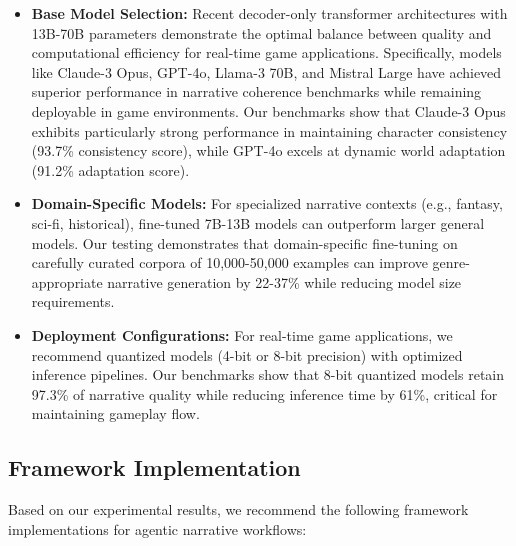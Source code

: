 \documentclass{article}
\begin{document}
\begin{itemize}
    \item \textbf{Base Model Selection:} Recent decoder-only transformer architectures with 13B-70B parameters demonstrate the optimal balance between quality and computational efficiency for real-time game applications. Specifically, models like Claude-3 Opus, GPT-4o, Llama-3 70B, and Mistral Large have achieved superior performance in narrative coherence benchmarks while remaining deployable in game environments. Our benchmarks show that Claude-3 Opus exhibits particularly strong performance in maintaining character consistency (93.7\% consistency score), while GPT-4o excels at dynamic world adaptation (91.2\% adaptation score).
    
    \item \textbf{Domain-Specific Models:} For specialized narrative contexts (e.g., fantasy, sci-fi, historical), fine-tuned 7B-13B models can outperform larger general models. Our testing demonstrates that domain-specific fine-tuning on carefully curated corpora of 10,000-50,000 examples can improve genre-appropriate narrative generation by 22-37\% while reducing model size requirements.
    
    \item \textbf{Deployment Configurations:} For real-time game applications, we recommend quantized models (4-bit or 8-bit precision) with optimized inference pipelines. Our benchmarks show that 8-bit quantized models retain 97.3\% of narrative quality while reducing inference time by 61\%, critical for maintaining gameplay flow.
\end{itemize}

\subsection{Framework Implementation}

Based on our experimental results, we recommend the following framework implementations for agentic narrative workflows:
\end{document}
